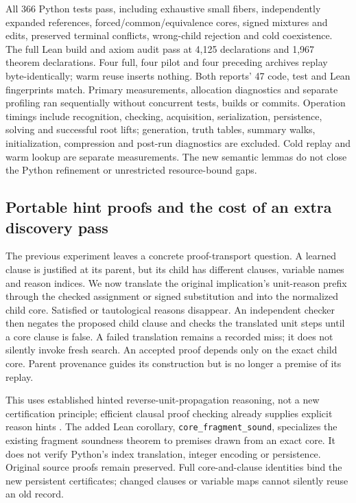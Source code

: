 \documentclass[11pt,a4paper]{article}
\numberwithin{equation}{section}
\theoremstyle{plain}
\theoremstyle{definition}
\theoremstyle{remark}
\begin{document}
All 366 Python tests pass, including exhaustive small fibers, independently expanded references, forced/common/equivalence cores, signed mixtures and edits, preserved terminal conflicts, wrong-child rejection and cold coexistence. The full Lean build and axiom audit pass at 4,125 declarations and 1,967 theorem declarations. Four full, four pilot and four preceding archives replay byte-identically; warm reuse inserts nothing. Both reports' 47 code, test and Lean fingerprints match. Primary measurements, allocation diagnostics and separate profiling ran sequentially without concurrent tests, builds or commits. Operation timings include recognition, checking, acquisition, serialization, persistence, solving and successful root lifts; generation, truth tables, summary walks, initialization, compression and post-run diagnostics are excluded. Cold replay and warm lookup are separate measurements. The new semantic lemmas do not close the Python refinement or unrestricted resource-bound gaps.

\subsection{Portable hint proofs and the cost of an extra discovery pass}
\label{sec:hint-transport}

The previous experiment leaves a concrete proof-transport question. A learned clause is justified at its parent, but its child has different clauses, variable names and reason indices. We now translate the original implication's unit-reason prefix through the checked assignment or signed substitution and into the normalized child core. Satisfied or tautological reasons disappear. An independent checker then negates the proposed child clause and checks the translated unit steps until a core clause is false. A failed translation remains a recorded miss; it does not silently invoke fresh search. An accepted proof depends only on the exact child core. Parent provenance guides its construction but is no longer a premise of its replay.

This uses established hinted reverse-unit-propagation reasoning, not a new certification principle; efficient clausal proof checking already supplies explicit reason hints \citep{cruzfilipe2017lrat}. The added Lean corollary, \texttt{core\_fragment\_sound}, specializes the existing fragment soundness theorem to premises drawn from an exact core. It does not verify Python's index translation, integer encoding or persistence. Original source proofs remain preserved. Full core-and-clause identities bind the new persistent certificates; changed clauses or variable maps cannot silently reuse an old record.
\end{document}
